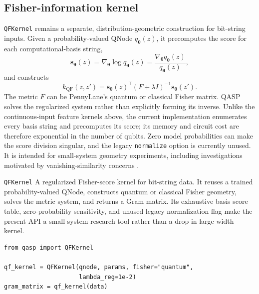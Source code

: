 \documentclass[10pt]{article}
\newcommand{\code}[1]{\texttt{#1}}
\begin{document}
\subsection{Fisher-information kernel}
\label{sec:fisher-kernel}

\code{QFKernel} remains a separate, distribution-geometric construction for
bit-string inputs.  Given a probability-valued QNode $q_{\bm\theta}(z)$, it
precomputes the score for each computational-basis string,
\begin{equation}
  \bm{s}_{\bm{\theta}}(z)
  =\nabla_{\bm{\theta}}\log q_{\bm{\theta}}(z)
  =\frac{\nabla_{\bm{\theta}}q_{\bm{\theta}}(z)}{q_{\bm{\theta}}(z)},
  \label{eq:qf-score}
\end{equation}
and constructs
\begin{equation}
  k_{\mathrm{QF}}(z,z')
  =\bm{s}_{\bm{\theta}}(z)^{\mathsf T}
  \left(F+\lambda I\right)^{-1}
  \bm{s}_{\bm{\theta}}(z').
  \label{eq:fisherkernel}
\end{equation}
The metric $F$ can be PennyLane's quantum or classical Fisher matrix.  QASP
solves the regularized system rather than explicitly forming its inverse.
Unlike the continuous-input feature kernels above, the current implementation
enumerates every basis string and precomputes its score; its memory and circuit
cost are therefore exponential in the number of qubits.  Zero model
probabilities can make the score division singular, and the legacy
\code{normalize} option is currently unused.  It is intended for small-system
geometry experiments, including investigations motivated by
vanishing-similarity concerns \cite{suzuki2024qfk}.

\begin{qaspfeature}{\code{QFKernel}}
A regularized Fisher-score kernel for bit-string data.  It reuses a trained
probability-valued QNode, constructs quantum or classical Fisher geometry,
solves the metric system, and returns a Gram matrix.  Its exhaustive basis
score table, zero-probability sensitivity, and unused legacy normalization
flag make the present API a small-system research tool rather than a drop-in
large-width kernel.
\end{qaspfeature}

\begin{lstlisting}[caption={Constructing a Fisher-information kernel from a trained probability-valued QNode and its parameters.},label={lst:qfkernel}]
from qasp import QFKernel

qf_kernel = QFKernel(qnode, params, fisher="quantum",
                     lambda_reg=1e-2)
gram_matrix = qf_kernel(data)
\end{lstlisting}
\end{document}
